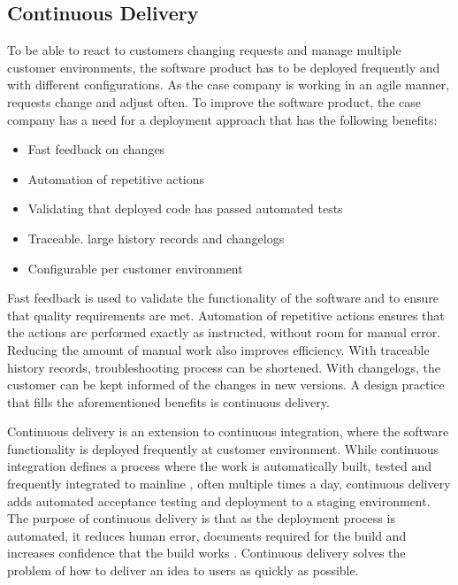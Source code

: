 \documentclass[english, grading]{tktltiki2}
\theoremstyle{definition}
\theoremstyle{remark}
\begin{document}



\subsection{Continuous Delivery}
To be able to react to customers changing requests and manage multiple customer environments, the software product has to be deployed frequently and with different configurations. As the case company is working in an agile manner, requests change and adjust often. To improve the software product, the case company has a need for a deployment approach that has the following benefits:

\begin{itemize}
\item Fast feedback on changes
\item Automation of repetitive actions
\item Validating that deployed code has passed automated tests 
\item Traceable. large history records and changelogs
\item Configurable per customer environment
\end{itemize}

Fast feedback is used to validate the functionality of the software and to ensure that quality requirements are met. Automation of repetitive actions ensures that the actions are performed exactly as instructed, without room for manual error. Reducing the amount of manual work also improves efficiency. With traceable history records, troubleshooting process can be shortened. With changelogs, the customer can be kept informed of the changes in new versions. A design practice that fills the aforementioned benefits is continuous delivery.

Continuous delivery is an extension to continuous integration, where the software functionality is deployed frequently at customer environment. While continuous integration defines a process where the work is automatically built, tested and frequently integrated to mainline \cite{duvall2007continuous}, often multiple times a day, continuous delivery adds automated acceptance testing and deployment to a staging environment. The purpose of continuous delivery is that as the deployment process is automated, it reduces human error, documents required for the build and increases confidence that the build works \cite{cdbook}. Continuous delivery solves the problem of how to deliver an idea to users as quickly as possible.
\end{document}
